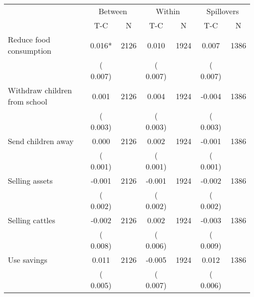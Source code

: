 
\begin{tabular}{l*{6}{c}}\hline&\multicolumn{2}{c}{Between}&\multicolumn{2}{c}{Within}&\multicolumn{2}{c}{Spillovers} \\ \cmidrule(r){2-3}\cmidrule(l){4-5}\cmidrule(l){6-7} & {T-C} & {N} & {T-C} & {N}  & {T-C}  & {N}  \\ \midrule
Reduce food consumption        &              0.016*      &       2126       &              0.010      &       1924       &              0.007      &       1386       \\
                       &       (       0.007)            &                               &       (       0.007)            &                               &       (       0.007)            &                               \\
Withdraw children from school        &              0.001      &       2126       &              0.004      &       1924       &             -0.004      &       1386       \\
                       &       (       0.003)            &                               &       (       0.003)            &                               &       (       0.003)            &                               \\
Send children away        &              0.000      &       2126       &              0.002      &       1924       &             -0.001      &       1386       \\
                       &       (       0.001)            &                               &       (       0.001)            &                               &       (       0.001)            &                               \\
Selling assets        &             -0.001      &       2126       &             -0.001      &       1924       &             -0.002      &       1386       \\
                       &       (       0.002)            &                               &       (       0.002)            &                               &       (       0.002)            &                               \\
Selling cattles        &             -0.002      &       2126       &              0.002      &       1924       &             -0.003      &       1386       \\
                       &       (       0.008)            &                               &       (       0.006)            &                               &       (       0.009)            &                               \\
Use savings        &              0.011      &       2126       &             -0.005      &       1924       &              0.012      &       1386       \\
                       &       (       0.005)            &                               &       (       0.007)            &                               &       (       0.006)            &                               \\
\hline \end{tabular}